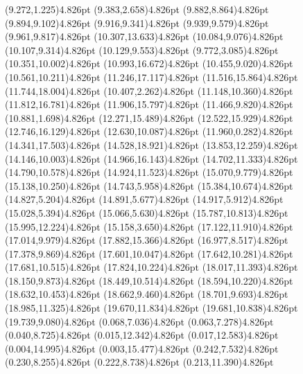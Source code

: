 \documentclass[10pt]{article}
\begin{document}
{{\qdisk(9.272,1.225){4.826pt}%
\qdisk(9.383,2.658){4.826pt}%
\qdisk(9.882,8.864){4.826pt}%
\qdisk(9.894,9.102){4.826pt}%
\qdisk(9.916,9.341){4.826pt}%
\qdisk(9.939,9.579){4.826pt}%
\qdisk(9.961,9.817){4.826pt}%
\qdisk(10.307,13.633){4.826pt}%
\qdisk(10.084,9.076){4.826pt}%
\qdisk(10.107,9.314){4.826pt}%
\qdisk(10.129,9.553){4.826pt}%
\qdisk(9.772,3.085){4.826pt}%
\qdisk(10.351,10.002){4.826pt}%
\qdisk(10.993,16.672){4.826pt}%
\qdisk(10.455,9.020){4.826pt}%
\qdisk(10.561,10.211){4.826pt}%
\qdisk(11.246,17.117){4.826pt}%
\qdisk(11.516,15.864){4.826pt}%
\qdisk(11.744,18.004){4.826pt}%
\qdisk(10.407,2.262){4.826pt}%
\qdisk(11.148,10.360){4.826pt}%
\qdisk(11.812,16.781){4.826pt}%
\qdisk(11.906,15.797){4.826pt}%
\qdisk(11.466,9.820){4.826pt}%
\qdisk(10.881,1.698){4.826pt}%
\qdisk(12.271,15.489){4.826pt}%
\qdisk(12.522,15.929){4.826pt}%
\qdisk(12.746,16.129){4.826pt}%
\qdisk(12.630,10.087){4.826pt}%
\qdisk(11.960,0.282){4.826pt}%
\qdisk(14.341,17.503){4.826pt}%
\qdisk(14.528,18.921){4.826pt}%
\qdisk(13.853,12.259){4.826pt}%
\qdisk(14.146,10.003){4.826pt}%
\qdisk(14.966,16.143){4.826pt}%
\qdisk(14.702,11.333){4.826pt}%
\qdisk(14.790,10.578){4.826pt}%
\qdisk(14.924,11.523){4.826pt}%
\qdisk(15.070,9.779){4.826pt}%
\qdisk(15.138,10.250){4.826pt}%
\qdisk(14.743,5.958){4.826pt}%
\qdisk(15.384,10.674){4.826pt}%
\qdisk(14.827,5.204){4.826pt}%
\qdisk(14.891,5.677){4.826pt}%
\qdisk(14.917,5.912){4.826pt}%
\qdisk(15.028,5.394){4.826pt}%
\qdisk(15.066,5.630){4.826pt}%
\qdisk(15.787,10.813){4.826pt}%
\qdisk(15.995,12.224){4.826pt}%
\qdisk(15.158,3.650){4.826pt}%
\qdisk(17.122,11.910){4.826pt}%
\qdisk(17.014,9.979){4.826pt}%
\qdisk(17.882,15.366){4.826pt}%
\qdisk(16.977,8.517){4.826pt}%
\qdisk(17.378,9.869){4.826pt}%
\qdisk(17.601,10.047){4.826pt}%
\qdisk(17.642,10.281){4.826pt}%
\qdisk(17.681,10.515){4.826pt}%
\qdisk(17.824,10.224){4.826pt}%
\qdisk(18.017,11.393){4.826pt}%
\qdisk(18.150,9.873){4.826pt}%
\qdisk(18.449,10.514){4.826pt}%
\qdisk(18.594,10.220){4.826pt}%
\qdisk(18.632,10.453){4.826pt}%
\qdisk(18.662,9.460){4.826pt}%
\qdisk(18.701,9.693){4.826pt}%
\qdisk(18.985,11.325){4.826pt}%
\qdisk(19.670,11.834){4.826pt}%
\qdisk(19.681,10.838){4.826pt}%
\qdisk(19.739,9.080){4.826pt}%
\dummycolor
\qdisk(0.068,7.036){4.826pt}%
\qdisk(0.063,7.278){4.826pt}%
\qdisk(0.040,8.725){4.826pt}%
\qdisk(0.015,12.342){4.826pt}%
\qdisk(0.017,12.583){4.826pt}%
\qdisk(0.004,14.995){4.826pt}%
\qdisk(0.003,15.477){4.826pt}%
\qdisk(0.242,7.532){4.826pt}%
\qdisk(0.230,8.255){4.826pt}%
\qdisk(0.222,8.738){4.826pt}%
\qdisk(0.213,11.390){4.826pt}%
}}
\end{document}
